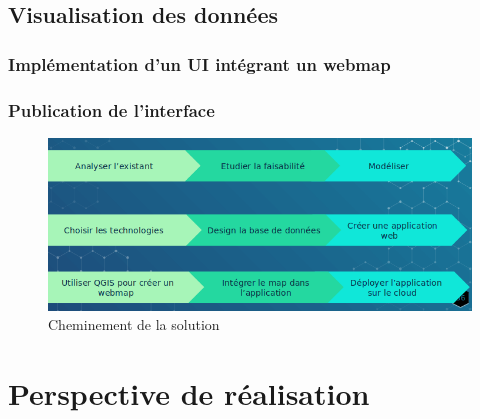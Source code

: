         \subsection{Visualisation des données} 
            \subsubsection{Implémentation d'un UI intégrant un webmap}
                
            \subsubsection{Publication de l'interface}
                
        \begin{figure}[t]
            \centering
            \includegraphics[width=1\textwidth]{images/Etude_de_l_existant/evolution_projetGIS.png}
            \caption{Cheminement de la solution}
        \end{figure}

    \section{Perspective de réalisation}
         